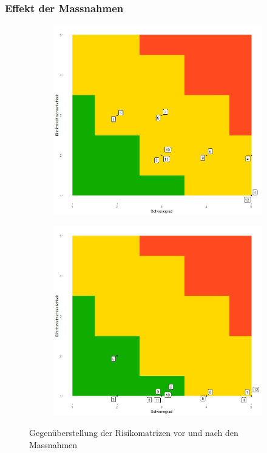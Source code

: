 \documentclass[a4paper]{report}
\begin{document}
\newpage
\subsubsection{Effekt der Massnahmen}
\label{ssec:MassEffekt}
\begin{figure}[h!]
	\centering
	\begin{subfigure}[b]{0.45\textwidth}
		\includegraphics[keepaspectratio,width=\textwidth]{Risikomatrix}
	\end{subfigure}
	\begin{subfigure}[b]{0.45\textwidth}
		\includegraphics[keepaspectratio,width=\textwidth]{Risikomatrix_nachher}
	\end{subfigure}
	\caption{Gegenüberstellung der Risikomatrizen vor und nach den Massnahmen}
	\label{fig:Gegenueberstellung}
\end{figure}
\end{document}
